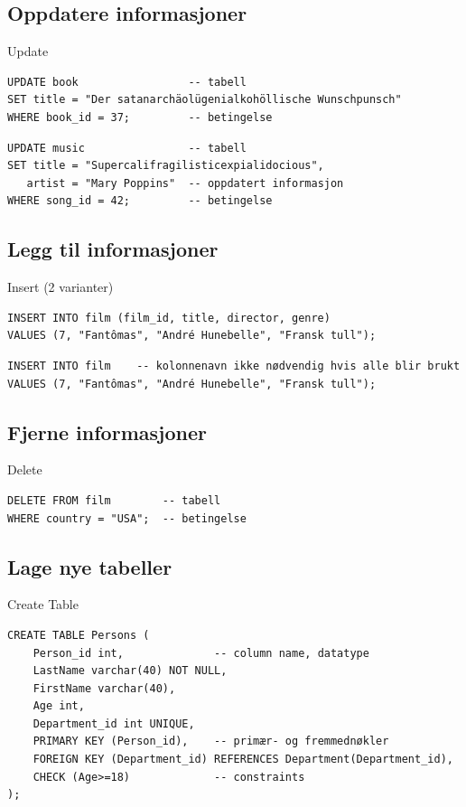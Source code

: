 \subsection*{Oppdatere informasjoner}
\begin{frame}[fragile]{Update}
\begin{verbatim}
UPDATE book                 -- tabell
SET title = "Der satanarchäolügenialkohöllische Wunschpunsch"
WHERE book_id = 37;         -- betingelse
\end{verbatim}
\pause
\vspace{-5mm}
\begin{verbatim}
UPDATE music                -- tabell
SET title = "Supercalifragilisticexpialidocious",
   artist = "Mary Poppins"  -- oppdatert informasjon
WHERE song_id = 42;         -- betingelse
\end{verbatim}
\end{frame}

\subsection*{Legg til informasjoner}
\begin{frame}[fragile]{Insert (2 varianter)}
\begin{verbatim}
INSERT INTO film (film_id, title, director, genre)
VALUES (7, "Fantômas", "André Hunebelle", "Fransk tull"); 
\end{verbatim}
\pause
\begin{verbatim}
INSERT INTO film    -- kolonnenavn ikke nødvendig hvis alle blir brukt
VALUES (7, "Fantômas", "André Hunebelle", "Fransk tull"); 
\end{verbatim}
\end{frame}

\subsection*{Fjerne informasjoner}
\begin{frame}[fragile]{Delete}
\begin{verbatim}
DELETE FROM film        -- tabell
WHERE country = "USA";  -- betingelse
\end{verbatim}
\end{frame}

\subsection*{Lage nye tabeller}
\begin{frame}[fragile]{Create Table}
\begin{verbatim}
CREATE TABLE Persons (
    Person_id int,              -- column name, datatype
    LastName varchar(40) NOT NULL,
    FirstName varchar(40),
    Age int,
    Department_id int UNIQUE,
    PRIMARY KEY (Person_id),    -- primær- og fremmednøkler
    FOREIGN KEY (Department_id) REFERENCES Department(Department_id),
    CHECK (Age>=18)             -- constraints
);
\end{verbatim}
\end{frame}

